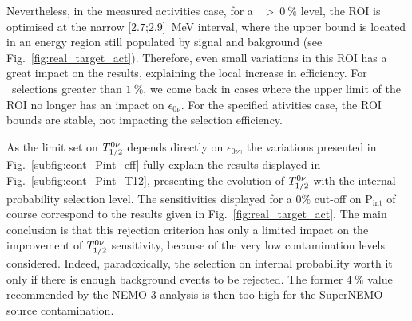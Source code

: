 Nevertheless, in the measured activities case, for a \Pint~$>~0~\%$ level, the ROI is optimised at the narrow [$2.7$;$2.9$]~MeV interval, where the upper bound is located in an energy region still populated by signal and bakground (see Fig.~\ref{fig:real_target_act}).
Therefore, even small variations in this ROI has a great impact on the results, explaining the local increase in efficiency.
For \Pint\ selections greater than $1~\%$, we come back in cases where the upper limit of the ROI no longer has an impact on $\epsilon_{0\nu}$.
For the specified ativities case, the ROI bounds are stable, not impacting the selection efficiency.

As the limit set on $T_{1/2}^{0\nu}$ depends directly on $\epsilon_{0\nu}$, the variations presented in Fig.~\ref{subfig:cont_Pint_eff} fully explain the results displayed in Fig.~\ref{subfig:cont_Pint_T12}, presenting the evolution of $T_{1/2}^{0\nu}$ with the internal probability selection level.
The sensitivities displayed for a $0\%$ cut-off on P$_{\text{int}}$ of course correspond to the results given in Fig.~\ref{fig:real_target_act}.
The main conclusion is that this rejection criterion has only a limited impact on the improvement of $T_{1/2}^{0\nu}$ sensitivity, because of the very low contamination levels considered.
Indeed, paradoxically, the selection on internal probability worth it only if there is enough background events to be rejected.
The former $4~\%$ value recommended by the NEMO-$3$ analysis is then too high for the SuperNEMO source contamination.

